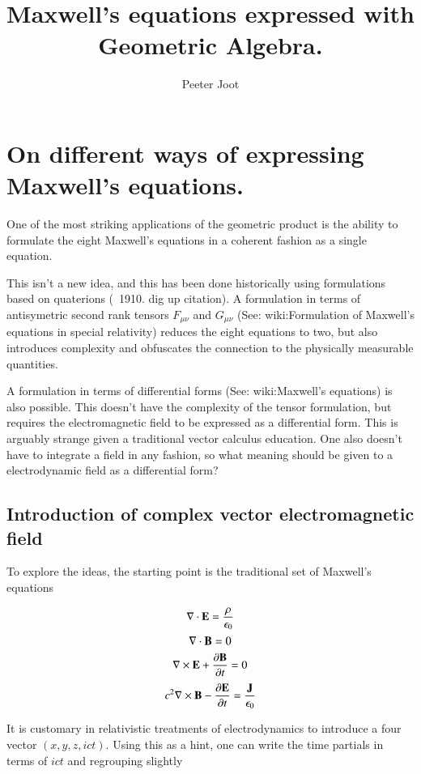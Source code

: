 \documentclass{article}      %
\title{Maxwell's equations expressed with Geometric Algebra.} %
\author{Peeter Joot}         %
\begin{document}

\maketitle{}

\section{On different ways of expressing Maxwell's equations.}

One of the most striking applications of the geometric product is the ability to formulate the eight Maxwell's equations in a coherent fashion as a single equation.

This isn't a new idea, and this has been done historically using formulations based on quaterions (~1910.  dig up citation).  A formulation in terms of antisymetric second rank tensors $F_{\mu \nu}$ and $G_{\mu \nu}$ (See: wiki:Formulation of Maxwell's equations in special relativity) reduces the eight equations to two, but also introduces complexity and obfuscates the connection to the physically measurable quantities.

A formulation in terms of differential forms (See: wiki:Maxwell's equations) is also possible.  This doesn't have the complexity of the tensor formulation, but requires the electromagnetic field to be expressed as a differential form.  This is arguably strange given a traditional vector calculus education.  One also doesn't have to integrate a field in any fashion, so what meaning should be given to a electrodynamic field as a differential form?

\subsection{Introduction of complex vector electromagnetic field }

To explore the ideas, the starting point is the traditional set of Maxwell's equations

\[
\nabla \cdot \mathbf{E}  = \frac {\rho} {\epsilon_0}
\]
\[
\nabla \cdot \mathbf{B}  = 0
\]
\[
\nabla \times \mathbf{E}  +\frac{\partial \mathbf{B} } {\partial t} = 0
\]
\[
c^2 \nabla \times \mathbf{B}  - \frac{\partial \mathbf{E} } {\partial t}
= \frac{\mathbf{J}}{\epsilon_0}
\]

It is customary in relativistic treatments of electrodynamics to introduce a four vector $(x, y, z, ict)$.  Using this as a hint, one can write the time partials in terms of $ict$ and regrouping slightly
\end{document}
